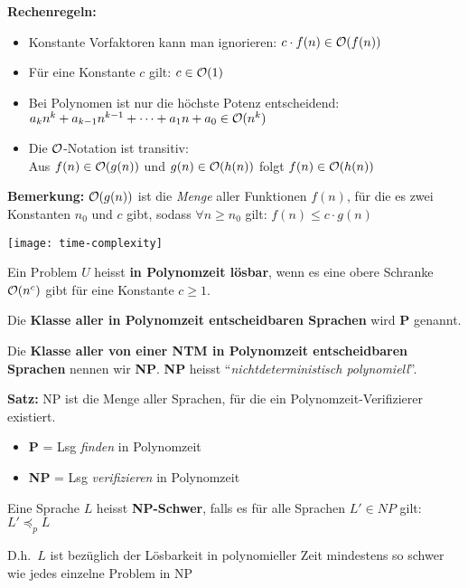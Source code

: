 \columnbreak

\textbf{Rechenregeln:}
\begin{itemize}
    \item Konstante Vorfaktoren kann man ignorieren: $c \cdot f(n) \in \mathcal{O}(f(n))$
    \item Für eine Konstante $c$ gilt: $c \in \mathcal{O}(1)$
    \item Bei Polynomen ist nur die höchste Potenz entscheidend:\\
    $a_k n^k + a_{k-1} n^{k-1} + \dots + a_1 n + a_0 \in \mathcal{O}(n^k)$
    \item Die $\mathcal{O}$-Notation ist transitiv:\\
    Aus $f(n) \in \mathcal{O}(g(n))$ und $g(n) \in \mathcal{O}(h(n))$ folgt $f(n) \in \mathcal{O}(h(n))$
\end{itemize}

\textbf{Bemerkung:} $\mathcal{O}(g(n))$ ist die \emph{Menge} aller Funktionen $f(n)$, für die es zwei Konstanten $n_0$ und $c$ gibt, sodass $\forall n \geq n_0$ gilt: $f(n) \leq c \cdot g(n)$

\texttt{[image: time-complexity]}


Ein Problem $U$ heisst \textbf{in Polynomzeit lösbar}, wenn es eine obere Schranke $\mathcal{O}(n^c)$ gibt für eine Konstante $c \geq 1$.

Die \textbf{Klasse aller in Polynomzeit entscheidbaren Sprachen} wird \textbf{P} genannt.

Die \textbf{Klasse aller von einer NTM in Polynomzeit entscheidbaren Sprachen} nennen wir \textbf{NP}. \textbf{NP} heisst ``\emph{nichtdeterministisch polynomiell}''.

\textbf{Satz:} NP ist die Menge aller Sprachen, für die ein Polynomzeit-Verifizierer existiert.
\begin{itemize}[label={}]
    \item \textbf{P} = Lsg \emph{finden} in Polynomzeit
    \item \textbf{NP} = Lsg \emph{verifizieren} in Polynomzeit
\end{itemize}


Eine Sprache $L$ heisst \textbf{NP-Schwer}, falls es für alle Sprachen $L' \in NP$ gilt: $L' \preceq_p L$

D.h.\ $L$ ist bezüglich der Lösbarkeit in polynomieller Zeit mindestens so schwer wie jedes einzelne Problem in NP

